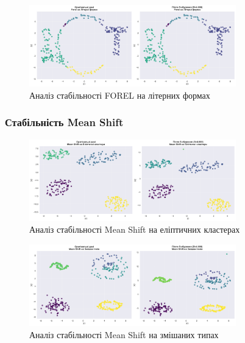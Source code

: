 \documentclass[12pt,a4paper]{article}
\begin{document}
\begin{figure}[H]
\centering
\includegraphics[width=0.8\textwidth]{clustering_visualizations/FOREL_Літерні_форми_stability.png}
\caption{Аналіз стабільності FOREL на літерних формах}
\label{fig:forel_stability_letters}
\end{figure}

\subsubsection{Стабільність Mean Shift}

\begin{figure}[H]
\centering
\includegraphics[width=0.8\textwidth]{clustering_visualizations/Mean Shift_Еліптичні_кластери_stability.png}
\caption{Аналіз стабільності Mean Shift на еліптичних кластерах}
\label{fig:meanshift_stability_elliptical}
\end{figure}

\begin{figure}[H]
\centering
\includegraphics[width=0.8\textwidth]{clustering_visualizations/Mean Shift_Змішані_типи_stability.png}
\caption{Аналіз стабільності Mean Shift на змішаних типах}
\label{fig:meanshift_stability_mixed}
\end{figure}
\end{document}
